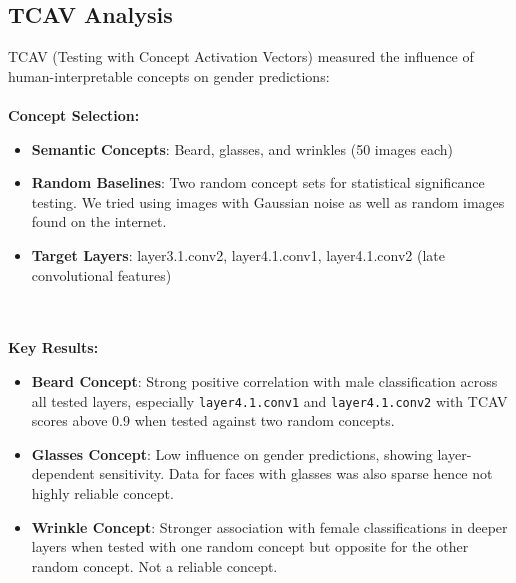 \documentclass[11pt,letterpaper]{article}
\begin{document}
\subsection{TCAV Analysis}
TCAV (Testing with Concept Activation Vectors) measured the influence of human-interpretable concepts on gender predictions:
\\
\\
\textbf{Concept Selection:}
\begin{itemize}
\item \textbf{Semantic Concepts}: Beard, glasses, and wrinkles (50 images each)
\item \textbf{Random Baselines}: Two random concept sets for statistical significance testing. We tried using images with Gaussian noise as well as random images found on the internet.
\item \textbf{Target Layers}: layer3.1.conv2, layer4.1.conv1, layer4.1.conv2 (late convolutional features)
\end{itemize}
\\
\\
\textbf{Key Results:}
\begin{itemize}
\item \textbf{Beard Concept}: Strong positive correlation with male classification across all tested layers, especially \texttt{layer4.1.conv1} and \texttt{layer4.1.conv2} with TCAV scores above 0.9 when tested against two random concepts.
\item \textbf{Glasses Concept}: Low influence on gender predictions, showing layer-dependent sensitivity. Data for faces with glasses was also sparse hence not highly reliable concept.
\item \textbf{Wrinkle Concept}: Stronger association with female classifications in deeper layers when tested with one random concept but opposite for the other random concept. Not a reliable concept.
\end{itemize}
\end{document}
